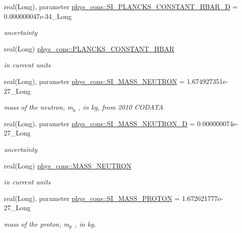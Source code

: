 \begin{DoxyCompactItemize}
real(Long), parameter \hyperlink{namespacephys__cons_af8ab82739d58ac3a1e1d9c97d3cfb4da}{phys\_\-cons::SI\_\-PLANCKS\_\-CONSTANT\_\-HBAR\_\-D} = 0.000000047e-\/34\_\-Long
\begin{DoxyCompactList}\small\item\em uncertainty \item\end{DoxyCompactList}\item 
real(Long) \hyperlink{namespacephys__cons_af0b754235993060b14fc81b7d1f702a5}{phys\_\-cons::PLANCKS\_\-CONSTANT\_\-HBAR}
\begin{DoxyCompactList}\small\item\em in current units \item\end{DoxyCompactList}\item 
real(Long), parameter \hyperlink{namespacephys__cons_ab117ad83bb79e4ed199d17f3c63ec4b3}{phys\_\-cons::SI\_\-MASS\_\-NEUTRON} = 1.674927351e-\/27\_\-Long
\begin{DoxyCompactList}\small\item\em mass of the neutron, m$_{\mbox{n}}$ , in kg, from 2010 CODATA \item\end{DoxyCompactList}\item 
real(Long), parameter \hyperlink{namespacephys__cons_af635c94d544c5bc6dcb05186a9f81d84}{phys\_\-cons::SI\_\-MASS\_\-NEUTRON\_\-D} = 0.000000074e-\/27\_\-Long
\begin{DoxyCompactList}\small\item\em uncertainty \item\end{DoxyCompactList}\item 
real(Long) \hyperlink{namespacephys__cons_abeff422917cc48601644e90ab12fb7c0}{phys\_\-cons::MASS\_\-NEUTRON}
\begin{DoxyCompactList}\small\item\em in current units \item\end{DoxyCompactList}\item 
real(Long), parameter \hyperlink{namespacephys__cons_a6a740864089f117512dc89ea53f3dc5f}{phys\_\-cons::SI\_\-MASS\_\-PROTON} = 1.672621777e-\/27\_\-Long
\begin{DoxyCompactList}\small\item\em mass of the proton, m$_{\mbox{p}}$ , in kg. \item\end{DoxyCompactList}\item 

\end{DoxyCompactItemize}
